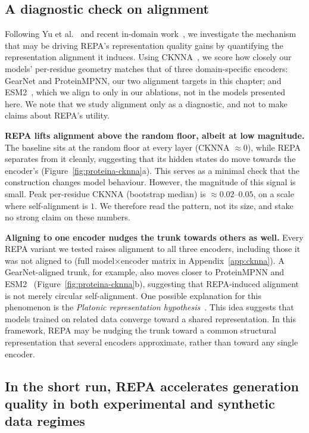 \documentclass[12pt,a4paper,twoside]{report}
\begin{document}
\subsection{A diagnostic check on alignment}
\label{sec:proteina-alignment}

Following Yu et al.~\cite{REPA} and recent in-domain work~\cite{BoltzREPA}, we investigate the mechanism that may be driving REPA's representation quality gains by quantifying the representation alignment it induces. Using CKNNA~\cite{PlatonicRep}, we score how closely our models' per-residue geometry matches that of three domain-specific encoders: GearNet and ProteinMPNN, our two alignment targets in this chapter; and ESM2~\cite{ESM2}, which we align to only in our ablations, not in the models presented here. We note that we study alignment only as a diagnostic, and not to make claims about REPA's utility.

\textbf{REPA lifts alignment above the random floor, albeit at low magnitude.} The baseline sits at the random floor at every layer (CKNNA $\approx 0$), while REPA separates from it cleanly, suggesting that its hidden states do move towards the encoder's (Figure~\ref{fig:proteina-cknna}a). This serves as a minimal check that the construction changes model behaviour. However, the magnitude of this signal is small. Peak per-residue CKNNA (bootstrap median) is $\approx 0.02$--$0.05$, on a scale where self-alignment is $1$. We therefore read the pattern, not its size, and stake no strong claim on these numbers.



\textbf{Aligning to one encoder nudges the trunk towards others as well.} Every REPA variant we tested raises alignment to all three encoders, including those it was not aligned to (full model$\times$encoder matrix in Appendix~\ref{app:cknna}). A GearNet-aligned trunk, for example, also moves closer to ProteinMPNN and ESM2~\cite{ESM2} (Figure~\ref{fig:proteina-cknna}b), suggesting that REPA-induced alignment is not merely circular self-alignment. One possible explanation for this phenomenon is the \emph{Platonic representation hypothesis}~\cite{PlatonicRep}. This idea suggests that models trained on related data converge toward a shared representation. In this framework, REPA may be nudging the trunk toward a common structural representation that several encoders approximate, rather than toward any single encoder.

\subsection{In the short run, REPA accelerates generation quality in both experimental and synthetic data regimes}
\label{sec:proteina-convergence}
\label{sec:proteina-genrep}
\end{document}
